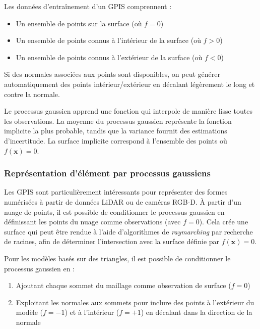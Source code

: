 Les données d'entraînement d'un GPIS comprennent :

\begin{itemize}[noitemsep]
    \item Un ensemble de points sur la surface (où $f = 0$)
    \item Un ensemble de points connus à l'intérieur de la surface (où $f > 0$)
    \item Un ensemble de points connus à l'extérieur de la surface (où $f < 0$)
\end{itemize}

Si des normales associées aux points sont disponibles, on peut générer automatiquement des points intérieur/extérieur en décalant légèrement le long et contre la normale.

Le processus gaussien apprend une fonction qui interpole de manière lisse toutes les observations. La moyenne du processus gaussien représente la fonction implicite la plus probable, tandis que la variance fournit des estimations d'incertitude. La surface implicite correspond à l'ensemble des points où $f(\mathbf{x}) = 0$.

\subsubsection{Représentation d'élément par processus gaussiens}

Les GPIS sont particulièrement intéressants pour représenter des formes numérisées à partir de données LiDAR ou de caméras RGB-D. À partir d'un nuage de points, il est possible de conditionner le processus gaussien en définissant les points du nuage comme observations (avec $f = 0$). Cela crée une surface qui peut être rendue à l'aide d'algorithmes de \textit{raymarching} par recherche de racines, afin de déterminer l'intersection avec la surface définie par $f(\mathbf{x}) = 0$.

Pour les modèles basés sur des triangles, il est possible de conditionner le processus gaussien en :

\begin{enumerate}[noitemsep]
    \item Ajoutant chaque sommet du maillage comme observation de surface ($f = 0$)
    \item Exploitant les normales aux sommets pour inclure des points à l'extérieur du modèle ($f = -1$) et à l'intérieur ($f = +1$) en décalant dans la direction de la normale
\end{enumerate}

